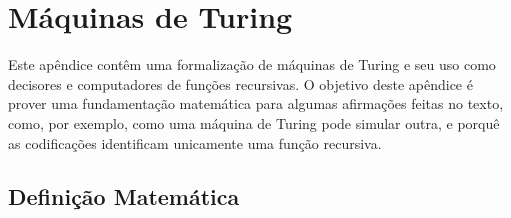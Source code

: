 \chapter{Máquinas de Turing}
\label{app:turing_machines}

\newcommand\B{\tikz{\draw (0, 0.5ex) -- (0, 0) -- (0.5em, 0) -- (0.5em, 0.5ex);}}

Este apêndice contêm uma formalização de máquinas de Turing
e seu uso como decisores e computadores de funções recursivas.
O objetivo deste apêndice é prover uma fundamentação matemática
para algumas afirmações feitas no texto,
como, por exemplo,
como uma máquina de Turing pode simular outra,
e porquê as codificações identificam unicamente uma função recursiva.

\section{Definição Matemática}


